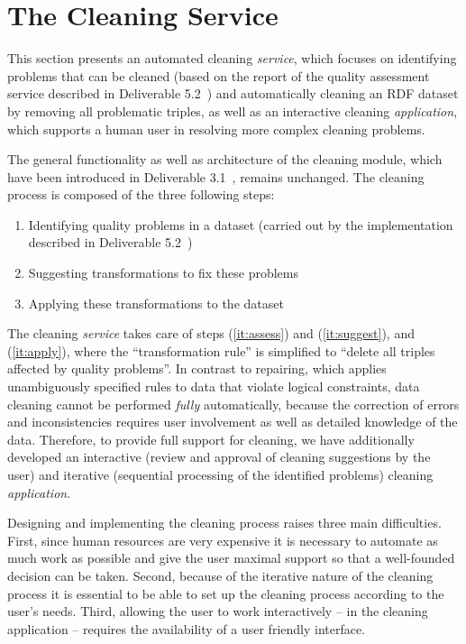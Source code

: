 \section{The Cleaning Service}
\label{sec:cleaning}

This section presents an automated cleaning \emph{service}, which focuses on identifying problems that can be cleaned (based on the report of the quality assessment service described in Deliverable 5.2~\cite{diachron-d5.2}) and automatically cleaning an RDF dataset by removing all problematic triples, as well as an interactive cleaning \emph{application}, which supports a human user in resolving more complex cleaning problems.

The general functionality as well as architecture of the cleaning module, which have been introduced in Deliverable 3.1~\cite{d3.1}, remains unchanged.
The cleaning process is composed of the three following steps:
\begin{enumerate}
	\item\label{it:assess} Identifying quality problems in a dataset (carried out by the implementation described in Deliverable 5.2~\cite{diachron-d5.2})
	\item\label{it:suggest} Suggesting transformations to fix these problems
	\item\label{it:apply} Applying these transformations to the dataset
\end{enumerate}

The cleaning \emph{service} takes care of steps (\ref{it:assess}) and (\ref{it:suggest}), and (\ref{it:apply}), where the ``transformation rule'' is simplified to ``delete all triples affected by quality problems''.
In contrast to repairing, which applies unambiguously specified rules to data that violate logical constraints, data cleaning cannot be performed \emph{fully} automatically, because the correction of errors and inconsistencies requires user involvement as well as detailed knowledge of the data. 
Therefore, to provide full support for cleaning, we have additionally developed an interactive (review and approval of cleaning suggestions by the user) and iterative (sequential processing of the identified problems) cleaning \emph{application}.

Designing and implementing the cleaning process raises three main difficulties.
First, since human resources are very expensive it is necessary to automate as much work as possible and give the user maximal support so that a well-founded decision can be taken. 
Second, because of the iterative nature of the cleaning process it is essential to be able to set up the cleaning process according to the user's needs. 
Third, allowing the user to work interactively – in the cleaning application – requires the availability of a user friendly interface.

